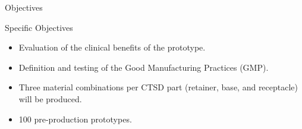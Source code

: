 \documentclass[10pt]{beamer}
\begin{document}
\begin{frame}[fragile]{Objectives}
\begin{alertblock}{Specific Objectives}
\begin{itemize}[<+- | alert@+>]
\item Evaluation of the clinical benefits of the prototype. 
\item Definition and testing of the Good Manufacturing Practices (GMP).  
\item Three material combinations per CTSD part (retainer, base, and receptacle) will be produced. 
\item 100 pre-production prototypes.
\end{itemize}
\end{alertblock}
\end{frame}
\end{document}
